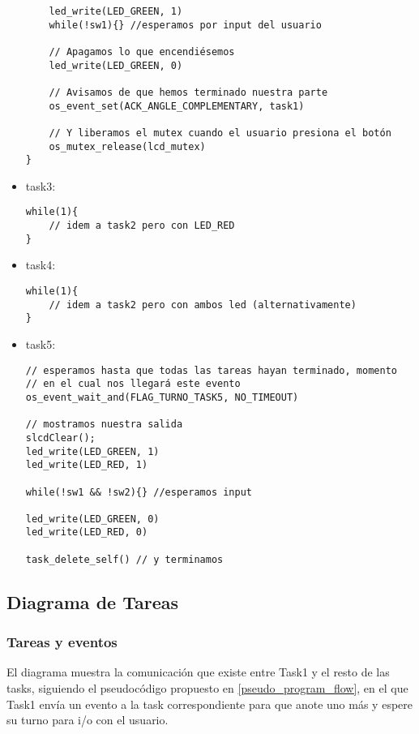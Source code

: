 \documentclass[a4paper,openright,12pt]{article}
\begin{document}
\begin{itemize}
\begin{samepage}
\begin{verbatim}
    led_write(LED_GREEN, 1)
    while(!sw1){} //esperamos por input del usuario

    // Apagamos lo que encendiésemos
    led_write(LED_GREEN, 0)

    // Avisamos de que hemos terminado nuestra parte
    os_event_set(ACK_ANGLE_COMPLEMENTARY, task1)

    // Y liberamos el mutex cuando el usuario presiona el botón
    os_mutex_release(lcd_mutex)  
}
    \end{verbatim}
    \end{samepage}
    \item task3:
    \begin{samepage}    
    \begin{verbatim}
while(1){
    // idem a task2 pero con LED_RED
}
    \end{verbatim}
    \end{samepage}
    \item task4:
    \begin{samepage}    
    \begin{verbatim}
while(1){
    // idem a task2 pero con ambos led (alternativamente)
}
    \end{verbatim}
    \end{samepage}
    \item task5:
    \begin{samepage}    
    \begin{verbatim}
// esperamos hasta que todas las tareas hayan terminado, momento
// en el cual nos llegará este evento
os_event_wait_and(FLAG_TURNO_TASK5, NO_TIMEOUT)

// mostramos nuestra salida
slcdClear();
led_write(LED_GREEN, 1)
led_write(LED_RED, 1)

while(!sw1 && !sw2){} //esperamos input

led_write(LED_GREEN, 0)
led_write(LED_RED, 0)

task_delete_self() // y terminamos
    \end{verbatim}
    \end{samepage}

\end{itemize}

\subsection{Diagrama de Tareas}\label{tasks}
\subsubsection{Tareas y eventos}
El diagrama muestra la comunicación que existe entre Task1 y el resto de las tasks, siguiendo el pseudocódigo propuesto en \ref{pseudo_program_flow}, en el que Task1 envía un evento
a la task correspondiente para que anote uno más y espere su turno para i/o con el usuario.
\end{document}
